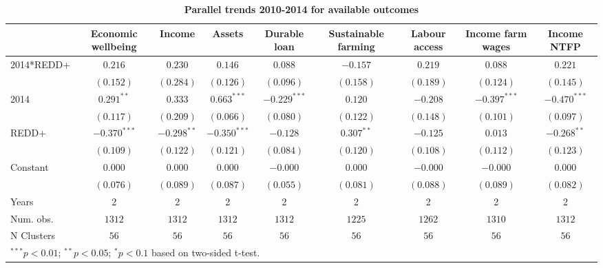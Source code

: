 \documentclass[
]{article}
\begin{document}
\begin{landscape}

\begin{table}[h]
\caption{\textbf{Parallel trends 2010-2014 for available outcomes}}
\begin{center}
\begin{tabular}{l c c c c c c c c}
\hline
 & Economic wellbeing & Income & Assets & Durable loan & Sustainable farming & Labour access & Income farm wages & Income NTFP \\
\hline
2014*REDD+ & $0.216$        & $0.230$       & $0.146$        & $0.088$        & $-0.157$     & $0.219$   & $0.088$        & $0.221$        \\
           & $(0.152)$      & $(0.284)$     & $(0.126)$      & $(0.096)$      & $(0.158)$    & $(0.189)$ & $(0.124)$      & $(0.145)$      \\
2014       & $0.291^{**}$   & $0.333$       & $0.663^{***}$  & $-0.229^{***}$ & $0.120$      & $-0.208$  & $-0.397^{***}$ & $-0.470^{***}$ \\
           & $(0.117)$      & $(0.209)$     & $(0.066)$      & $(0.080)$      & $(0.122)$    & $(0.148)$ & $(0.101)$      & $(0.097)$      \\
REDD+      & $-0.370^{***}$ & $-0.298^{**}$ & $-0.350^{***}$ & $-0.128$       & $0.307^{**}$ & $-0.125$  & $0.013$        & $-0.268^{**}$  \\
           & $(0.109)$      & $(0.122)$     & $(0.121)$      & $(0.084)$      & $(0.120)$    & $(0.108)$ & $(0.112)$      & $(0.123)$      \\
Constant   & $0.000$        & $0.000$       & $0.000$        & $-0.000$       & $0.000$      & $-0.000$  & $-0.000$       & $0.000$        \\
           & $(0.076)$      & $(0.089)$     & $(0.087)$      & $(0.055)$      & $(0.081)$    & $(0.088)$ & $(0.089)$      & $(0.082)$      \\
\hline
Years      & 2              & 2             & 2              & 2              & 2            & 2         & 2              & 2              \\
Num. obs.  & $1312$         & $1312$        & $1312$         & $1312$         & $1225$       & $1262$    & $1310$         & $1312$         \\
N Clusters & $56$           & $56$          & $56$           & $56$           & $56$         & $56$      & $56$           & $56$           \\
\hline
\multicolumn{9}{l}{\scriptsize{\parbox{1.05\linewidth}{\vspace{2pt}$^{***}p<0.01$; $^{**}p<0.05$; $^{*}p<0.1$ based on two-sided t-test.\\
}}}
\end{tabular}
\end{center}
\end{table}
\end{landscape}
\end{document}
